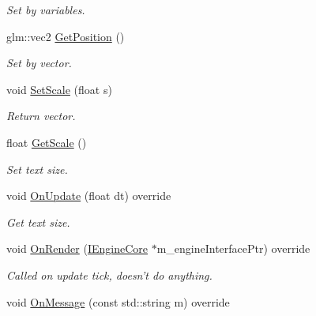 \begin{DoxyCompactItemize}
\begin{DoxyCompactList}\small\item\em Set by variables. \end{DoxyCompactList}\item 
\hypertarget{class_text_u_i_component_a9a149a41cd8f98204632cfa57cbd5ca6}{glm\+::vec2 \hyperlink{class_text_u_i_component_a9a149a41cd8f98204632cfa57cbd5ca6}{Get\+Position} ()}\label{class_text_u_i_component_a9a149a41cd8f98204632cfa57cbd5ca6}

\begin{DoxyCompactList}\small\item\em Set by vector. \end{DoxyCompactList}\item 
\hypertarget{class_text_u_i_component_a19811b97b0a51afd3250096f5ea25f35}{void \hyperlink{class_text_u_i_component_a19811b97b0a51afd3250096f5ea25f35}{Set\+Scale} (float s)}\label{class_text_u_i_component_a19811b97b0a51afd3250096f5ea25f35}

\begin{DoxyCompactList}\small\item\em Return vector. \end{DoxyCompactList}\item 
\hypertarget{class_text_u_i_component_a24b50b130650496d77050a8429c29658}{float \hyperlink{class_text_u_i_component_a24b50b130650496d77050a8429c29658}{Get\+Scale} ()}\label{class_text_u_i_component_a24b50b130650496d77050a8429c29658}

\begin{DoxyCompactList}\small\item\em Set text size. \end{DoxyCompactList}\item 
\hypertarget{class_text_u_i_component_a7013fa585ef3300ef6968025da8b87ee}{void \hyperlink{class_text_u_i_component_a7013fa585ef3300ef6968025da8b87ee}{On\+Update} (float dt) override}\label{class_text_u_i_component_a7013fa585ef3300ef6968025da8b87ee}

\begin{DoxyCompactList}\small\item\em Get text size. \end{DoxyCompactList}\item 
void \hyperlink{class_text_u_i_component_aca5ef2d0ab17d8f8851c41391acc1d3b}{On\+Render} (\hyperlink{class_i_engine_core}{I\+Engine\+Core} $\ast$m\+\_\+engine\+Interface\+Ptr) override
\begin{DoxyCompactList}\small\item\em Called on update tick, doesn't do anything. \end{DoxyCompactList}\item 
\hypertarget{class_text_u_i_component_a830dc9a5050fdc98d11b23fa6effd815}{void \hyperlink{class_text_u_i_component_a830dc9a5050fdc98d11b23fa6effd815}{On\+Message} (const std\+::string m) override}\label{class_text_u_i_component_a830dc9a5050fdc98d11b23fa6effd815}


\end{DoxyCompactItemize}
